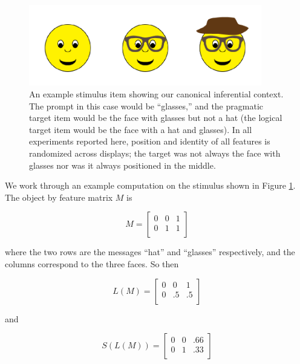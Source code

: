 \documentclass[man,noapacite]{apa2}
\begin{document}
\begin{figure}[t]
  \centering
  \includegraphics[width=4in]{figures/hatglasses.pdf}
  \caption{\label{fig:ex} An example stimulus item showing our canonical inferential context. The prompt in this case would be ``glasses,'' and the pragmatic target item would be the face with glasses but not a hat (the logical target item would be the face with a hat and glasses). In all experiments reported here, position and identity of all features is randomized across displays; the target was not always the face with glasses nor was it always positioned in the middle.}
\end{figure}

We work through an example computation on the stimulus shown in Figure \ref{fig:ex}. The object by feature matrix $M$ is

\begin{equation}
M = \left[
    \begin{array}{ccc}
      0 & 0 & 1 \\
      0 & 1 & 1\\
    \end{array}
  \right]
\end{equation}

\noindent where the two rows are the messages ``hat'' and ``glasses'' respectively, and the columns correspond to the three faces. So then


\begin{equation}
L(M) = \left[
    \begin{array}{ccc}
      0 & 0 & 1 \\
      0 & .5 & .5\\
    \end{array}
  \right]
\end{equation}

and

\begin{equation}
S(L(M)) = \left[
    \begin{array}{ccc}
      0 & 0 & .66 \\
      0 & 1 & .33\\
    \end{array}
  \right]
\end{equation}
\end{document}
